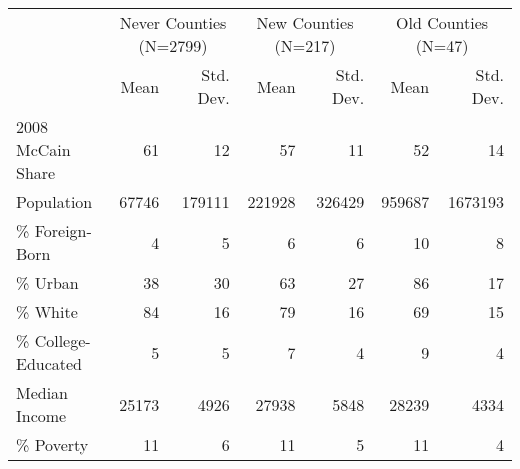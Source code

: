 \begin{table}
\centering
\begin{tabular}[t]{lrrrrrr}
\toprule
\multicolumn{1}{c}{ } & \multicolumn{2}{c}{Never Counties (N=2799)} & \multicolumn{2}{c}{New Counties (N=217)} & \multicolumn{2}{c}{Old Counties (N=47)} \\
\cmidrule(l{3pt}r{3pt}){2-3} \cmidrule(l{3pt}r{3pt}){4-5} \cmidrule(l{3pt}r{3pt}){6-7}
  & Mean & Std. Dev. & Mean & Std. Dev. & Mean & Std. Dev.\\
\midrule
2008 McCain Share & 61 & 12 & 57 & 11 & 52 & 14\\
Population & 67746 & 179111 & 221928 & 326429 & 959687 & 1673193\\
\% Foreign-Born & 4 & 5 & 6 & 6 & 10 & 8\\
\% Urban & 38 & 30 & 63 & 27 & 86 & 17\\
\% White & 84 & 16 & 79 & 16 & 69 & 15\\
\% College-Educated & 5 & 5 & 7 & 4 & 9 & 4\\
Median Income & 25173 & 4926 & 27938 & 5848 & 28239 & 4334\\
\% Poverty & 11 & 6 & 11 & 5 & 11 & 4\\
\bottomrule
\end{tabular}
\end{table}
